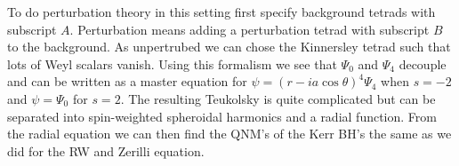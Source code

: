 \documentclass[12 pt]{article}
\begin{document}
To do perturbation theory in this setting first specify background tetrads with subscript $A$. Perturbation means adding a perturbation tetrad with subscript $B$ to the background.  As unpertrubed we can chose the Kinnersley tetrad such that lots of Weyl scalars vanish. Using this formalism we see that $\Psi_0$ and $\Psi_4$ decouple and can be written as a master equation for $\psi = (r-ia\cos \theta )^4 \Psi_4$ when $s= -2$ and $\psi = \Psi_0$ for $s=2$. 
The resulting Teukolsky is quite complicated but can be separated into spin-weighted spheroidal harmonics and a radial function. From the radial equation we can then find the QNM's of the Kerr BH's the same as we did for the RW and Zerilli equation. 






















\cite{dataAnalysis}


\end{document}
